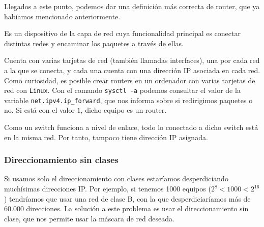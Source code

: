 Llegados a este punto, podemos dar una definición más correcta de router, que ya habíamos mencionado anteriormente.
\begin{definicion}[Router]
    Es un dispositivo de la capa de red cuya funcionalidad principal es conectar distintas redes y encaminar los paquetes a través de ellas.
    
    Cuenta con varias tarjetas de red (también llamadas interfaces), una por cada red a la que se conecta, y cada una cuenta con una dirección IP asociada en cada red.\\

    Como curiosidad, es posible crear routers en un ordenador con varias tarjetas de red con \verb|Linux|. Con el comando \verb|sysctl -a| podemos consultar el valor de la variable \verb|net.ipv4.ip_forward|, que nos informa sobre si redirigimos paquetes o no. Si está con el valor $1$, dicho equipo es un router.
\end{definicion}

\begin{observacion}
    Como un switch funciona a nivel de enlace, todo lo conectado a dicho switch está en la misma red. Por tanto, tampoco tiene dirección IP asignada.
\end{observacion}


\subsubsection{Direccionamiento sin clases}

Si usamos solo el direccionamiento con clases estaríamos desperdiciando muchísimas direcciones IP. Por ejemplo, si tenemos 1000 equipos ($2^8<1000<2^16$) tendríamos que usar una red de clase B, con la que desperdiciaríamos más de 60.000 direcciones. La solución a este problema es usar el direccionamiento sin clase, que nos permite usar la máscara de red deseada.


